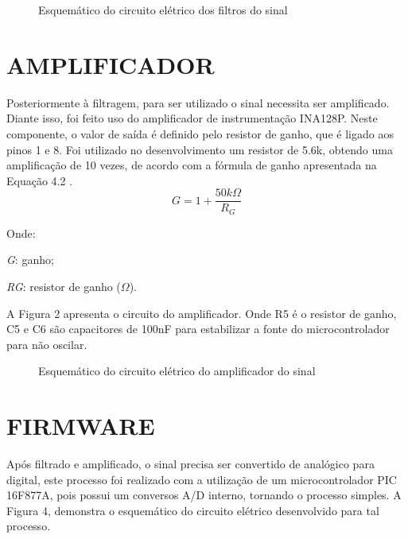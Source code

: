 \begin{figure}[h] 
	\begin{center} 
		\begin{center}
			\changecaptionwidth 
			\captionwidth{15.8cm} %
			\caption{\label{fig_fot7}Esquemático do circuito elétrico dos filtros do sinal}
		\end{center}
	\end{center}
\end{figure} 

\section{AMPLIFICADOR}
Posteriormente à filtragem, para ser utilizado o sinal necessita ser amplificado. Diante isso, foi feito uso do amplificador de instrumentação INA128P. Neste componente, o valor de saída é definido pelo resistor de ganho, que é ligado aos pinos 1 e 8. Foi utilizado no desenvolvimento um resistor de 5.6k, obtendo uma amplificação de 10 vezes, de acordo com a fórmula de ganho apresentada na Equação 4.2 \cite{Geovani2}.  
\begin{equation}
	G = 1 + \frac {50k\Omega}{R_G}
\end{equation}

Onde:

\textit{G}: ganho;

\textit{R\tiny{G}}: resistor de ganho ($\Omega$).

A Figura 2 apresenta o circuito do amplificador. Onde R5 é o resistor de ganho, C5 e C6 são capacitores de 100nF para estabilizar a fonte do microcontrolador para não oscilar.
\newpage
\begin{figure}[h] 
	\begin{center} 
		\begin{center}
			\changecaptionwidth 
			\captionwidth{11.0cm} %
			\caption{\label{fig_fot7}Esquemático do circuito elétrico do amplificador do sinal}
		\end{center}
	\end{center}
\end{figure} 


\section{FIRMWARE}
Após filtrado e amplificado, o sinal precisa ser convertido de analógico para digital, este processo foi realizado com a utilização de um microcontrolador PIC 16F877A, pois possui um conversos A/D interno, tornando o processo simples. A Figura 4, demonstra o esquemático do circuito elétrico desenvolvido para tal processo. 


